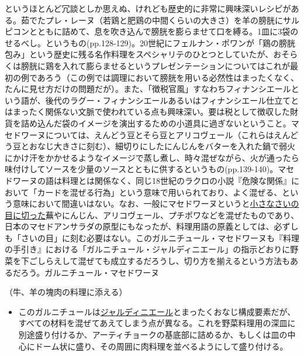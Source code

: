 \begin{recette}
{{{{  というほとんど冗談としか思えぬ、けれども歴史的に非常に興味深いレシピがある。茹でたプレ・レーヌ（若鶏と肥鶏の中間くらいの大きさ）を羊の膀胱にサルピコンとともに詰めて、息を吹き込んで膀胱を膨らませて口を縛る。1皿に3袋のせるべし。というもの(pp.128-129)。20世紀にフェルナン・ポワンが「鶏の膀胱包み」という歴史に残る名作料理をスペシャリテのひとつとしていたが、おそらくは膀胱に鶏を入れて膨らませるというプレゼンテーションについてはこれが最初の例であろう（この例では調理において膀胱を用いる必然性はまったくなく、たんに見せ方だけの問題だが）。また、「徴税官風」すなわちフィナンシエールという語が、後代のラグー・フィナンシエールあるいはフィナンシエール仕立てとはまったく関係ない文脈で使われている点も興味深い。要は税として徴収した財貨を詰め込んだ袋のイメージを演出するための小道具に過ぎないということ。マセドワーヌについては、えんどう豆とそら豆とアリコヴェール（これらはえんどう豆とおなじ大きさに刻む）、細切りにしたにんじんをバターを入れた鍋で弱火にかけ汗をかかせるようなイメージで蒸し煮し、時々混ぜながら、火が通ったら味付けしてソースを少量のソースとともに供するというもの(pp.139-140)。マセドワーヌの語は料理とは関係なく、同じ18世紀のラクロの小説『危険な関係』において「カードを混ぜる行為」という意味で用いられており、よく混ぜる、という意味において間違いはない。なお、一般にマセドワーヌというと\ul{小さなさいの目に切った}蕪やにんじん、アリコヴェール、プチポワなどを混ぜたものであり、日本のマセドアンサラダの原型にもなったが、料理用語の原義としては、必ずしも「さいの目」に刻む必要はない。このガルニチュール・マセドワーヌも『料理の手引き』における「ガルニチュール・ジャルディニエール」の指示どおりに野菜を下ごしらえして混ぜても成立するだろうし、切り方を揃えるという方法もあるだろう。}}{ガルニチュール・マセドワーヌ}}\label{garniture-macedoine}}



（牛、羊の塊肉の料理に添える）

\begin{itemize}
\tightlist
\item
  このガルニチュールは\protect\hyperlink{garniture-jardiniere}{ジャルディニエール}とまったくおなじ構成要素だが、すべての材料を混ぜてあえてしまう点が異なる。これを野菜料理用の深皿に別途盛り付けるか、アーティチョークの基底部に詰めるか、もしくは皿の中心にドーム状に盛り、その周囲に肉料理を並べるようにして盛り付ける。
\end{itemize}


\end{recette}
